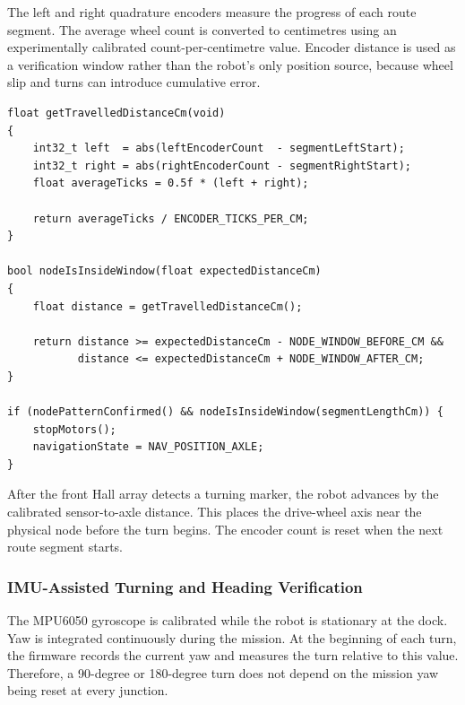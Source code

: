 \documentclass[12pt,a4paper]{article}
\begin{document}
The left and right quadrature encoders measure the progress of each route
segment. The average wheel count is converted to centimetres using an
experimentally calibrated count-per-centimetre value. Encoder distance is used
as a verification window rather than the robot's only position source, because
wheel slip and turns can introduce cumulative error.

\begin{lstlisting}[caption={Encoder distance and expected-node window.},label={lst:encoder-window}]
float getTravelledDistanceCm(void)
{
    int32_t left  = abs(leftEncoderCount  - segmentLeftStart);
    int32_t right = abs(rightEncoderCount - segmentRightStart);
    float averageTicks = 0.5f * (left + right);

    return averageTicks / ENCODER_TICKS_PER_CM;
}

bool nodeIsInsideWindow(float expectedDistanceCm)
{
    float distance = getTravelledDistanceCm();

    return distance >= expectedDistanceCm - NODE_WINDOW_BEFORE_CM &&
           distance <= expectedDistanceCm + NODE_WINDOW_AFTER_CM;
}

if (nodePatternConfirmed() && nodeIsInsideWindow(segmentLengthCm)) {
    stopMotors();
    navigationState = NAV_POSITION_AXLE;
}
\end{lstlisting}

After the front Hall array detects a turning marker, the robot advances by the
calibrated sensor-to-axle distance. This places the drive-wheel axis near the
physical node before the turn begins. The encoder count is reset when the next
route segment starts.

\subsubsection{IMU-Assisted Turning and Heading Verification}

The MPU6050 gyroscope is calibrated while the robot is stationary at the dock.
Yaw is integrated continuously during the mission. At the beginning of each
turn, the firmware records the current yaw and measures the turn relative to
this value. Therefore, a 90-degree or 180-degree turn does not depend on
the mission yaw being reset at every junction.
\end{document}
